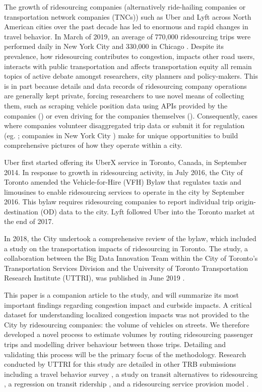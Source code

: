\documentclass[]{trbunofficial_bdit_final}
\begin{document}
The growth of ridesourcing companies (alternatively ride-hailing companies or
transportation network companies (TNCs)) such as Uber and Lyft across North
American cities over the past decade has led to enormous and rapid changes in
travel behavior. In March of 2019, an average of 770,000 ridesourcing trips
were performed daily in New York City \cite{schneider2019dashboard} and
330,000 in Chicago \cite{chicago2019transportation}. Despite its prevalence,
how ridesourcing contributes to congestion, impacts other road users, interacts
with public transportation and affects transportation equity all remain topics
of active debate amongst researchers, city planners and policy-makers. This is
in part because details and data records of ridesourcing company operations are
generally kept private, forcing researchers to use novel means of collecting
them, such as scraping vehicle position data using APIs provided by the
companies () or even driving for the companies
themselves (). Consequently, cases where companies
volunteer disaggregated trip data or submit it for regulation (eg.
; companies in New York City \cite{nyctlc2019report})
make for unique opportunities to build comprehensive pictures of how they
operate within a city.

Uber first started offering its UberX service in Toronto, Canada, in September
2014. In response to growth in ridesourcing activity, in July 2016, the City of
Toronto amended the Vehicle-for-Hire (VFH) Bylaw \cite{vfhbylaw} that regulates
taxis and limousines to enable ridesourcing services to operate in the city by
September 2016. This bylaw requires ridesourcing companies to report individual
trip origin-destination (OD) data to the city. Lyft followed Uber into the
Toronto market at the end of 2017.

In 2018, the City undertook a comprehensive review of the bylaw, which included
a study on the transportation impacts of ridesourcing in Toronto. The study, a
collaboration between the Big Data Innovation Team within the City of Toronto's
Transportation Services Division and the University of Toronto Transportation
Research Institute (UTTRI), was published in June 2019 \citep{bdittoreport}.

This paper is a companion article to the study, and will summarize its most
important findings regarding congestion impact and curbside impacts. A critical
dataset for understanding localized congestion impacts was not provided to the
City by ridesourcing companies: the volume of vehicles on streets. We
therefore developed a novel process to estimate volumes by routing ridesourcing
passenger trips and modelling driver behaviour between those trips. Detailing
and validating this process will be the primary focus of the methodology.
Research conducted by UTTRI for this study are
detailed in other TRB submissions including a travel behavior survey
\cite{loatrb}, a study on transit alternatives to ridesourcing
\cite{wenting2019transitcharacteristics}, a regression on transit ridership
\cite{wenting2019transitcompetition}, and a ridesourcing service provision
model \cite{calderontrb}.
\end{document}
